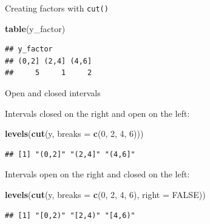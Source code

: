 \documentclass[ignorenonframetext,]{beamer}
\newenvironment{Shaded}{\begin{snugshade}}{\end{snugshade}}
\newcommand{\DataTypeTok}[1]{\textcolor[rgb]{0.13,0.29,0.53}{#1}}
\newcommand{\DecValTok}[1]{\textcolor[rgb]{0.00,0.00,0.81}{#1}}
\newcommand{\KeywordTok}[1]{\textcolor[rgb]{0.13,0.29,0.53}{\textbf{#1}}}
\newcommand{\NormalTok}[1]{#1}
\newcommand{\OtherTok}[1]{\textcolor[rgb]{0.56,0.35,0.01}{#1}}
\begin{document}
\begin{frame}[fragile]{Creating factors with \texttt{cut()}}
\protect\hypertarget{creating-factors-with-cut-2}{}

\begin{Shaded}
\begin{Highlighting}[]
\KeywordTok{table}\NormalTok{(y_factor)}
\end{Highlighting}
\end{Shaded}

\begin{verbatim}
## y_factor
## (0,2] (2,4] (4,6] 
##     5     1     2
\end{verbatim}

\end{frame}

\begin{frame}[fragile]{Open and closed intervals}
\protect\hypertarget{open-and-closed-intervals}{}

Intervals closed on the right and open on the left:

\begin{Shaded}
\begin{Highlighting}[]
\KeywordTok{levels}\NormalTok{(}\KeywordTok{cut}\NormalTok{(y, }\DataTypeTok{breaks =} \KeywordTok{c}\NormalTok{(}\DecValTok{0}\NormalTok{, }\DecValTok{2}\NormalTok{, }\DecValTok{4}\NormalTok{, }\DecValTok{6}\NormalTok{))) }
\end{Highlighting}
\end{Shaded}

\begin{verbatim}
## [1] "(0,2]" "(2,4]" "(4,6]"
\end{verbatim}

Intervals open on the right and closed on the left:

\begin{Shaded}
\begin{Highlighting}[]
\KeywordTok{levels}\NormalTok{(}\KeywordTok{cut}\NormalTok{(y, }\DataTypeTok{breaks =} \KeywordTok{c}\NormalTok{(}\DecValTok{0}\NormalTok{, }\DecValTok{2}\NormalTok{, }\DecValTok{4}\NormalTok{, }\DecValTok{6}\NormalTok{), }\DataTypeTok{right =} \OtherTok{FALSE}\NormalTok{)) }
\end{Highlighting}
\end{Shaded}

\begin{verbatim}
## [1] "[0,2)" "[2,4)" "[4,6)"
\end{verbatim}

\end{frame}
\end{document}
